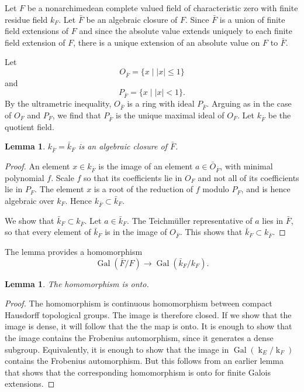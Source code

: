 \documentclass{amsart}
\newtheorem{lemma}[equation]{Lemma}
\def\abs#1{{|#1|}}
\def\op#1{{\operatorname{#1}}}
\def\oG{\op{Gal}}
\begin{document}
Let $F$ be a nonarchimedean
complete valued field of characteristic zero with finite residue field $k_F$.
Let $\bar{F}$ be an algebraic closure of $F$.  Since $\bar{F}$ is a union of
finite field extensions of $F$ and since the absolute value extends uniquely to
each finite field extension of $F$, there is a unique extension of an absolute
value on $F$ to $\bar{F}$.

Let 
\[
O_{\bar F} = \{x \mid \abs{x}\le 1\}
\]
and
\[
P_{\bar F} = \{x \mid \abs{x} < 1\}.
\]
By the ultrametric inequality, $O_{\bar F}$ is a ring with ideal $P_{\bar F}$.
Arguing as in the case of $O_F$ and $P_F$, we find that $P_{\bar F}$ is the unique
maximal ideal of $O_F$.  Let $k_{\bar F}$ be the quotient field.

\begin{lemma}
$k_{\bar F} = \bar{k}_F$
is an algebraic closure of $\bar{F}$.
\end{lemma}

\begin{proof} An element $x\in k_{\bar F}$ is the image of an element
  $a\in\bar O_{\bar F}$, with minimal polynomial $f$.  Scale $f$ so
  that its coefficients lie in $O_{F}$ and not all of its coefficients
  lie in $P_F$.  The element $x$ is a root of the reduction of $f$
  modulo $P_F$, and is hence algebraic over $k_F$.  Hence $ k_{\bar
    F}\subset \bar{k}_F$.

We show that $\bar{k}_F\subset k_{\bar F}$.  Let $a\in \bar{k}_F$.
The Teichm\"uller representative of $a$ lies in $\bar F$, so that every
element of $\bar{k}_F$ is in the image of $O_{\bar F}$.  This shows
that $\bar{k}_F\subset k_{\bar F}$.
\end{proof}

The lemma provides a homomorphism
\[
\oG(\bar F/F)\to \oG(\bar{k}_{F}/k_F).
\]

\begin{lemma} The homomorphism is onto.
\end{lemma}


\begin{proof} The homomorphism is continuous homomorphism between compact
Hausdorff topological groups.  The image is therefore closed.  If we show
that the image is dense, it will follow that the the map is onto.  It is
enough to show that the image contains the Frobenius automorphism, since
it generates a dense subgroup.  Equivalently, it is enough to show that
the image in $\oG(\op{k}_E/\op{k}_F)$ contains the Frobenius automorphism.
But this follows from an earlier lemma
that shows that the corresponding homomorphism is onto for finite Galois extensions.
\end{proof}
\end{document}
